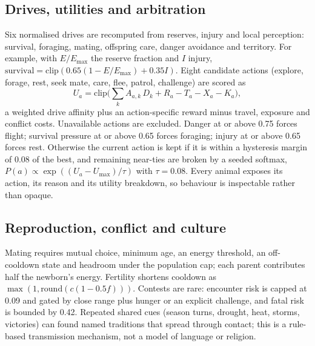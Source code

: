 \documentclass[conference]{IEEEtran}
\begin{document}
\subsection{Drives, utilities and arbitration}
Six normalised drives are recomputed from reserves, injury and local perception:
survival, foraging, mating, offspring care, danger avoidance and territory. For
example, with $E/E_{\max}$ the reserve fraction and $I$ injury,
$\text{survival}=\mathrm{clip}(0.65(1-E/E_{\max})+0.35I)$. Eight candidate
actions (explore, forage, rest, seek mate, care, flee, patrol, challenge) are
scored as
\begin{equation}
U_a=\mathrm{clip}\Big(\sum_k A_{a,k}\,D_k+R_a-T_a-X_a-K_a\Big),
\end{equation}
a weighted drive affinity plus an action-specific reward minus travel, exposure and
conflict costs. Unavailable actions are excluded. Danger at or above 0.75 forces
flight; survival pressure at or above 0.65 forces foraging; injury at or above 0.65
forces rest. Otherwise the current action is kept if it is within a hysteresis
margin of 0.08 of the best, and remaining near-ties are broken by a seeded softmax,
$P(a)\propto\exp((U_a-U_{\max})/\tau)$ with $\tau=0.08$. Every animal exposes its
action, its reason and its utility breakdown, so behaviour is inspectable rather
than opaque.

\subsection{Reproduction, conflict and culture}
Mating requires mutual choice, minimum age, an energy threshold, an off-cooldown
state and headroom under the population cap; each parent contributes half the
newborn's energy. Fertility shortens cooldown as
$\max(1,\mathrm{round}(c(1-0.5f)))$. Contests are rare: encounter risk is capped
at 0.09 and gated by close range plus hunger or an explicit challenge, and fatal
risk is bounded by 0.42. Repeated shared cues (season turns, drought, heat,
storms, victories) can found named traditions that spread through contact; this is
a rule-based transmission mechanism, not a model of language or religion.
\end{document}
